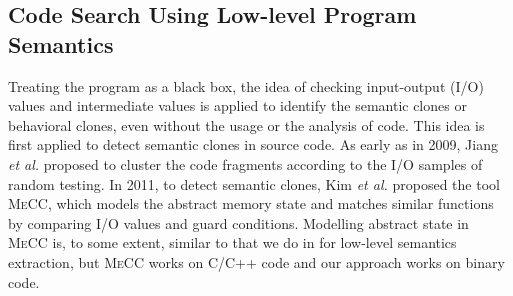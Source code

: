 \subsection{Code Search Using Low-level Program Semantics}
Treating the program as a black box, the idea of checking input-output (I/O) values and intermediate values is applied to identify the
semantic clones or behavioral clones, even without the usage or the analysis of code. This idea is first applied to detect semantic clones in source code.
As early as in 2009, Jiang \emph{et al.} \cite{DBLP:conf/issta/JiangS09}   %
proposed to cluster the code fragments according to the I/O samples of random testing.
In 2011, to detect semantic clones, Kim \emph{et al.} \cite{DBLP:conf/icse/KimJKY11} proposed the tool \textsc{MeCC}, which models the abstract memory state and matches similar functions by comparing I/O values and guard conditions. Modelling abstract state in \textsc{MeCC} is, to some extent, similar to that we do in \tool for low-level semantics extraction, but \textsc{MeCC} works on C/C++ code and our approach works on binary code.


